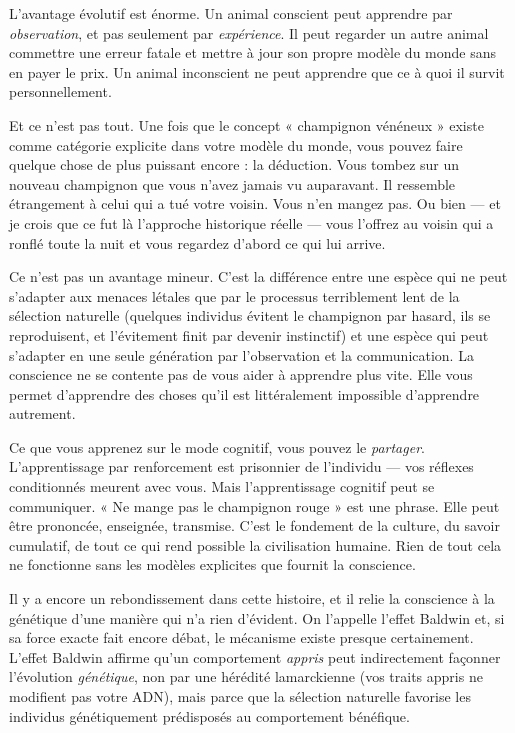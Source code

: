 \documentclass[11pt, twoside, openright]{book}
\begin{document}
L'avantage évolutif est énorme. Un animal conscient peut apprendre par \textit{observation}, et pas seulement par \textit{expérience}. Il peut regarder un autre animal commettre une erreur fatale et mettre à jour son propre modèle du monde sans en payer le prix. Un animal inconscient ne peut apprendre que ce à quoi il survit personnellement.

Et ce n'est pas tout. Une fois que le concept « champignon vénéneux » existe comme catégorie explicite dans votre modèle du monde, vous pouvez faire quelque chose de plus puissant encore : la déduction. Vous tombez sur un nouveau champignon que vous n'avez jamais vu auparavant. Il ressemble étrangement à celui qui a tué votre voisin. Vous n'en mangez pas. Ou bien --- et je crois que ce fut là l'approche historique réelle --- vous l'offrez au voisin qui a ronflé toute la nuit et vous regardez d'abord ce qui lui arrive.

Ce n'est pas un avantage mineur. C'est la différence entre une espèce qui ne peut s'adapter aux menaces létales que par le processus terriblement lent de la sélection naturelle (quelques individus évitent le champignon par hasard, ils se reproduisent, et l'évitement finit par devenir instinctif) et une espèce qui peut s'adapter en une seule génération par l'observation et la communication. La conscience ne se contente pas de vous aider à apprendre plus vite. Elle vous permet d'apprendre des choses qu'il est littéralement impossible d'apprendre autrement.

Ce que vous apprenez sur le mode cognitif, vous pouvez le \textit{partager}. L'apprentissage par renforcement est prisonnier de l'individu --- vos réflexes conditionnés meurent avec vous. Mais l'apprentissage cognitif peut se communiquer. « Ne mange pas le champignon rouge » est une phrase. Elle peut être prononcée, enseignée, transmise. C'est le fondement de la culture, du savoir cumulatif, de tout ce qui rend possible la civilisation humaine. Rien de tout cela ne fonctionne sans les modèles explicites que fournit la conscience.

Il y a encore un rebondissement dans cette histoire, et il relie la conscience à la génétique d'une manière qui n'a rien d'évident. On l'appelle l'effet Baldwin et, si sa force exacte fait encore débat, le mécanisme existe presque certainement. L'effet Baldwin affirme qu'un comportement \textit{appris} peut indirectement façonner l'évolution \textit{génétique}, non par une hérédité lamarckienne (vos traits appris ne modifient pas votre ADN), mais parce que la sélection naturelle favorise les individus génétiquement prédisposés au comportement bénéfique.
\end{document}
